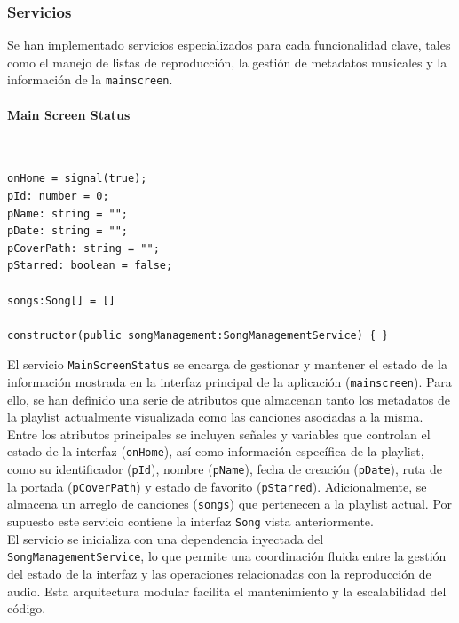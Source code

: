 \documentclass[11pt, a4paper]{article}
\begin{document}
            \subsubsection{Servicios}

            Se han implementado servicios especializados para cada funcionalidad clave, tales como el manejo de listas de reproducción, la gestión de metadatos musicales y la información de la \texttt{mainscreen}.

                \paragraph{Main Screen Status}
                ‎

                \begin{lstlisting}[caption={Atributos Main Screen Status}]
onHome = signal(true);
pId: number = 0;
pName: string = "";
pDate: string = "";
pCoverPath: string = "";
pStarred: boolean = false;

songs:Song[] = []

constructor(public songManagement:SongManagementService) { }
                \end{lstlisting}

                El servicio \texttt{MainScreenStatus} se encarga de gestionar y mantener el estado de la información mostrada en la interfaz principal de la aplicación (\texttt{mainscreen}). Para ello, se han definido una serie de atributos que almacenan tanto los metadatos de la playlist actualmente visualizada como las canciones asociadas a la misma. \\

                Entre los atributos principales se incluyen señales y variables que controlan el estado de la interfaz (\texttt{onHome}), así como información específica de la playlist, como su identificador (\texttt{pId}), nombre (\texttt{pName}), fecha de creación (\texttt{pDate}), ruta de la portada (\texttt{pCoverPath}) y estado de favorito (\texttt{pStarred}). Adicionalmente, se almacena un arreglo de canciones (\texttt{songs}) que pertenecen a la playlist actual. Por supuesto este servicio contiene la interfaz \texttt{Song} vista anteriormente. \\

                El servicio se inicializa con una dependencia inyectada del \\ \texttt{SongManagementService}, lo que permite una coordinación fluida entre la gestión del estado de la interfaz y las operaciones relacionadas con la reproducción de audio. Esta arquitectura modular facilita el mantenimiento y la escalabilidad del código. \\
\end{document}
